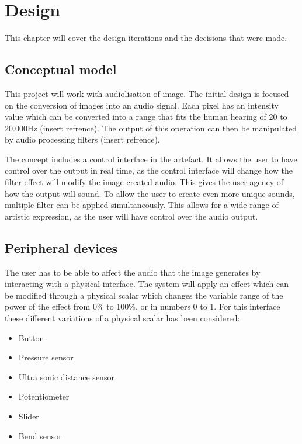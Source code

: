 \chapter{Design}\label{ch:design}
This chapter will cover the design iterations and the decisions that were made. 

\section{Conceptual model}
This project will work with audiolisation of image. The initial design is focused on the conversion of images into an audio signal. Each pixel has an intensity value which can be converted into a range that fits the human hearing of 20 to 20.000Hz (insert refrence). The output of this operation can then be manipulated by audio processing filters (insert refrence).

The concept includes a control interface in the artefact. It allows the user to have control over the output in real time, as the control interface will change how the filter effect will modify the image-created audio. This gives the user agency of how the output will sound. To allow the user to create even more unique sounds, multiple filter can be applied simultaneously. This allows for a wide range of artistic expression, as the user will have control over the audio output.

\section{Peripheral devices}
The user has to be able to affect the audio that the image generates by interacting with a physical interface. The system will apply an effect which can be modified through a physical scalar which changes the variable range of the power of the effect from 0\% to 100\%, or in numbers 0 to 1. For this interface these different variations of a physical scalar has been considered: 

\begin{itemize}
\item Button
\item Pressure sensor
\item Ultra sonic distance sensor
\item Potentiometer
\item Slider
\item Bend sensor
\end{itemize}

